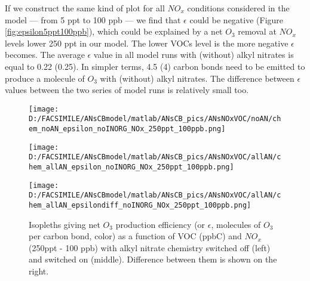 \documentclass[11pt,a4paper]{article}
\begin{document}
If we construct the same kind of plot for all $NO_x$ conditions considered in the model --- from 5 ppt to 100 ppb --- we find that $\epsilon$ could be negative (Figure \ref{fig:epsilon5ppt100ppb}), which could be explained by a net $O_3$ removal at $NO_x$ levels lower 250 ppt in our model. The lower VOCs level is the more negative $\epsilon$ becomes. The average $\epsilon$ value in all model runs with (without) alkyl nitrates is equal to 0.22 (0.25). In simpler terms, 4.5 (4) carbon bonds need to be emitted to produce a molecule of $O_3$ with (without) alkyl nitrates. The difference between $\epsilon$ values between the two series of model runs is relatively small too.

\begin{figure} %
\centering
\begin{minipage}{.5\textwidth}
  \centering
  \texttt{[image: D:/FACSIMILE/ANsCBmodel/matlab/ANsCB\_pics/ANsNOxVOC/noAN/chem\_noAN\_epsilon\_noINORG\_NOx\_250ppt\_100ppb.png]}
\end{minipage}
\begin{minipage}{.5\textwidth}
  \centering
  \texttt{[image: D:/FACSIMILE/ANsCBmodel/matlab/ANsCB\_pics/ANsNOxVOC/allAN/chem\_allAN\_epsilon\_noINORG\_NOx\_250ppt\_100ppb.png]}
\end{minipage}
\begin{minipage}{.5\textwidth}
  \centering
  \texttt{[image: D:/FACSIMILE/ANsCBmodel/matlab/ANsCB\_pics/ANsNOxVOC/allAN/chem\_allAN\_epsilondiff\_noINORG\_NOx\_250ppt\_100ppb.png]}
\end{minipage}
\caption{Isopleths giving net $O_3$ production efficiency (or $\epsilon$, molecules of $O_3$ per carbon bond, color) as a function of VOC (ppbC) and $NO_x$ (250ppt - 100 ppb) with alkyl nitrate chemistry switched off (left) and switched on (middle). Difference between them is shown on the right.}\label{fig:epsilon250ppt100ppb}
\end{figure}
\end{document}
